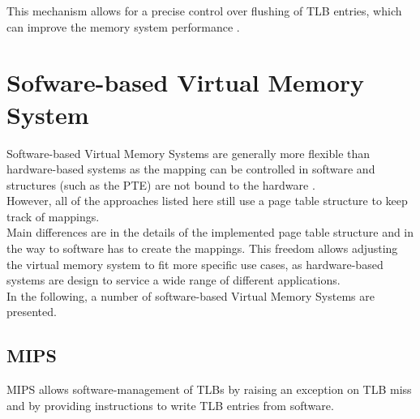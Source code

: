This mechanism allows for a precise control over flushing of TLB entries, which can improve the
memory system performance \cite{RISCVInstructionSet}.










\section{Sofware-based Virtual Memory System}

Software-based Virtual Memory Systems are generally more flexible than hardware-based systems
as the mapping can be controlled in software and structures (such as the PTE) are not bound
to the hardware \cite{jacob1998virtualissues}.\\
However, all of the approaches listed here still use a page table structure to keep track of mappings.\\
Main differences are in the details of the implemented page table structure and in the way to software has to create the mappings. This freedom allows adjusting the virtual memory system to fit more specific use cases, as hardware-based systems are design to service a wide range of different applications\cite{citation needed}.\\
In the following, a number of software-based Virtual Memory Systems are presented.
\subsection{MIPS}
MIPS \cite{MIPSArchitectureProgrammers2016} allows software-management of TLBs by raising an exception on TLB miss and by providing instructions to write TLB entries from software.

